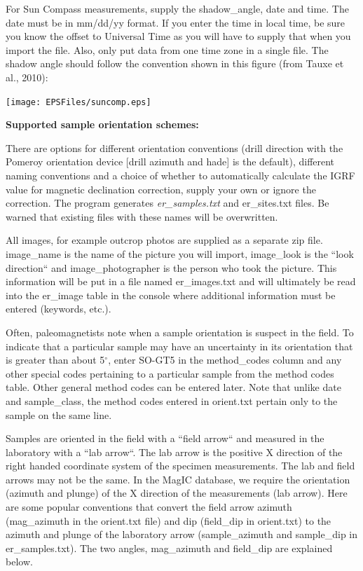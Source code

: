 \documentclass[11pt]{book}
\begin{document}
{ For Sun Compass measurements, supply the shadow\_angle, date and time. The date must be in mm/dd/yy format. If you enter the time in local time, be sure you know the offset to Universal Time as you will have to supply that when you import the file. Also, only put data from one time zone in a single file. The shadow angle should follow the convention shown in this figure (from Tauxe et al., 2010): \nocite{tauxe10}

  \texttt{[image: EPSFiles/suncomp.eps]}


{\bf Supported sample orientation schemes:}

  There are options for
 different orientation conventions (drill direction with the Pomeroy orientation device  [drill azimuth and hade] is the default), different naming conventions and a choice of whether to automatically calculate the IGRF value for magnetic declination correction, supply your own or ignore the correction.  The program generates {\it er\_samples.txt} and {er\_sites.txt} files.  Be warned that existing files with these names will be overwritten.

 All images, for example outcrop photos are supplied as a separate zip file. image\_name is the name of the picture you will import, image\_look is the ``look direction`` and image\_photographer is the person who took the picture. This information will be put in a file named er\_images.txt and will ultimately be read into the er\_image table in the console where additional information must be entered (keywords, etc.).

Often, paleomagnetists note when a sample orientation is suspect in the field. To indicate that a particular sample may have an uncertainty in its orientation that is greater than about 5$^{\circ}$, enter SO-GT5 in the method\_codes column and any other special codes pertaining to a particular sample from the method codes table. Other general method codes can be entered later. Note that unlike date and sample\_class, the method codes entered in orient.txt pertain only to the sample on the same line.

Samples are oriented in the field with a ``field arrow`` and measured in the laboratory with a ``lab arrow``. The lab arrow is the positive X direction of the right handed coordinate system of the specimen measurements. The lab and field arrows may not be the same. In the MagIC database, we require the orientation (azimuth and plunge) of the X direction of the measurements (lab arrow). Here are some popular conventions that convert the field arrow azimuth (mag\_azimuth in the orient.txt file) and dip (field\_dip in orient.txt) to the azimuth and plunge of the laboratory arrow (sample\_azimuth and sample\_dip in er\_samples.txt). The two angles, mag\_azimuth and field\_dip are explained below.

}
\end{document}
